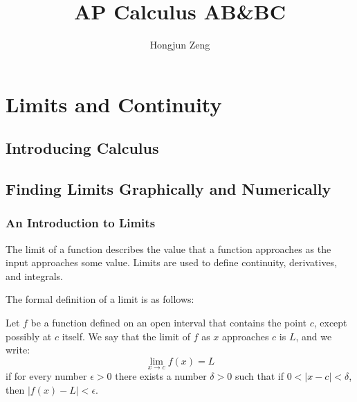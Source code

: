 


\title{AP Calculus AB\&BC}
\author{Hongjun Zeng}
\maketitle

\lipsum[1-10] 

\newpage
\tableofcontents

\newpage
\section{Limits and Continuity}
\subsection{Introducing Calculus}
\newpage
\subsection{Finding Limits Graphically and Numerically}
\subsubsection{An Introduction to Limits}

The limit of a function describes the value that a function approaches as the input approaches some value. Limits are used to define continuity, derivatives, and integrals.

The formal definition of a limit is as follows: 


\begin{Definition}{}{}
Let \( f \) be a function defined on an open interval that contains the point \( c \), except possibly at \( c \) itself. We say that the limit of \( f \) as \( x \) approaches \( c \) is \( L \), and we write:
\[
\lim_{x \to c} f(x) = L
\]
if for every number \( \epsilon > 0 \) there exists a number \( \delta > 0 \) such that if \( 0 < |x - c| < \delta \), then \( |f(x) - L| < \epsilon \).
\end{Definition}

